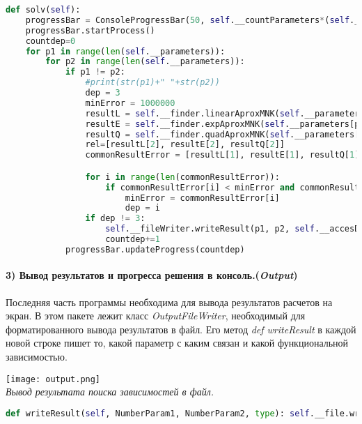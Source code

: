     \begin{lstlisting}[language=Python]
def solv(self):
    progressBar = ConsoleProgressBar(50, self.__countParameters*(self.__countParameters-1))
    progressBar.startProcess()
    countdep=0
    for p1 in range(len(self.__parameters)):
        for p2 in range(len(self.__parameters)):
            if p1 != p2:
                #print(str(p1)+" "+str(p2))
                dep = 3
                minError = 1000000
                resultL = self.__finder.linearAproxMNK(self.__parameters[p1], self.__parameters[p2])
                resultE = self.__finder.expAproxMNK(self.__parameters[p1], self.__parameters[p2])
                resultQ = self.__finder.quadAproxMNK(self.__parameters[p1], self.__parameters[p2])
                rel=[resultL[2], resultE[2], resultQ[2]]
                commonResultError = [resultL[1], resultE[1], resultQ[1]]

                for i in range(len(commonResultError)):
                    if commonResultError[i] < minError and commonResultError[i] < self.__maxRelError and rel[i]:
                        minError = commonResultError[i]
                        dep = i
                if dep != 3:
                    self.__fileWriter.writeResult(p1, p2, self.__accesDependList[dep])
                    countdep+=1
            progressBar.updateProgress(countdep)
    \end{lstlisting}


    \paragraph{3) Вывод результатов и прогресса решения в консоль.(\textit{Output})\\
    }
     Последняя часть программы необходима для вывода результатов расчетов на экран. В этом пакете лежит класс \textit{OutputFileWriter}, необходимый для форматированного вывода результатов в файл. Его метод \textit{def writeResult} в каждой новой строке пишет то, какой параметр с каким связан и какой функциональной зависимостью.

     \begin{center}
        \texttt{[image: output.png]}\\
        \textit{Вывод результата поиска зависимостей в файл.}
    \end{center}

     \begin{lstlisting}[language=Python]
def writeResult(self, NumberParam1, NumberParam2, type): self.__file.write("Параметр " + str(NumberParam1) + " связан с параметром " + str(NumberParam2) +": Зависимость "+ type + "\n")
     \end{lstlisting}

